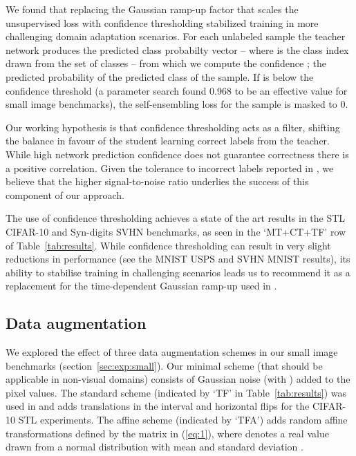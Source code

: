 \documentclass{article}
\begin{document}
We found that replacing the Gaussian ramp-up factor that scales the unsupervised loss with confidence thresholding stabilized training in more challenging domain adaptation scenarios. For each unlabeled sample  the teacher network produces the predicted class probabilty vector  -- where  is the class index drawn from the set of classes  -- from which we compute the confidence ; the predicted probability of the predicted class of the sample. If  is below the confidence threshold (a parameter search found 0.968 to be an effective value for small image benchmarks), the self-ensembling loss for the sample  is masked to 0.

Our working hypothesis is that confidence thresholding acts as a filter, shifting the balance in favour of the student learning correct labels from the teacher. While high network prediction confidence does not guarantee correctness there is a positive correlation. Given the tolerance to incorrect labels reported in \cite{Laine:Temporal}, we believe that the higher signal-to-noise ratio underlies the success of this component of our approach.

The use of confidence thresholding achieves a state of the art results in the STL  CIFAR-10 and Syn-digits  SVHN benchmarks, as seen in the `MT+CT+TF' row of Table~\ref{tab:results}. While confidence thresholding can result in very slight reductions in performance (see the  MNIST  USPS and SVHN  MNIST results), its ability to stabilise training in challenging scenarios leads us to recommend it as a replacement for the time-dependent Gaussian ramp-up used in \cite{Laine:Temporal}.


\subsection{Data augmentation}
\label{sec:method:aug}

We explored the effect of three data augmentation schemes in our small image benchmarks (section~\ref{sec:exp:small}). Our minimal scheme (that should be applicable in non-visual domains) consists of Gaussian noise (with ) added to the pixel values. The standard scheme (indicated by `TF' in Table~\ref{tab:results}) was used in \cite{Laine:Temporal} and adds translations in the interval  and horizontal flips for the CIFAR-10  STL experiments. The affine scheme (indicated by `TFA') adds random affine transformations defined by the matrix in (\ref{eq:1}), where  denotes a real value drawn from a normal distribution with mean  and standard deviation .
\end{document}
